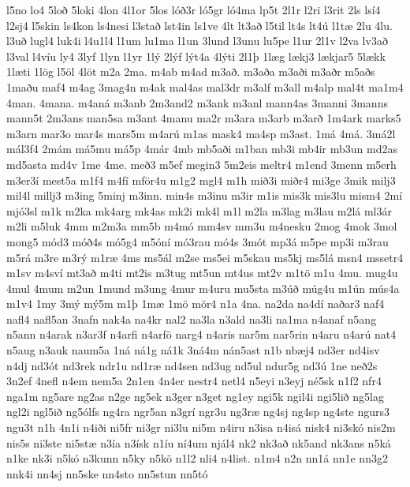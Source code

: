 {l5no
lo4
5lo^^f0
5loki
4lon
4l1or
5los
l^^f3^^f03r
l^^f35gr
l^^f34ma
lp5t
2l1r
l2ri
l3rit
2ls
ls^^ed4
l2sj4
l5skin
ls4kon
ls4nesi
l3sta^^f0
lst4in
ls1ve
4lt
lt3a^^f0
l5til
lt4s
lt4^^fa
l1t^^e6
2lu
4lu.
l3u^^f0
lugl4
luk4i
l4u1l4
l1um
lu1ma
l1un
3lund
l3unu
lu5pe
l1ur
2l1v
l2va
lv3a^^f0
l3val
l4v^^edu
ly4
3lyf
1lyn
l1yr
1l^^fd
2l^^fdf
l^^fdt4a
4l^^fdti
2l1^^fe
1l^^e6g
l^^e6kj3
l^^e6kjar5
5l^^e6kk
1l^^e6ti
1l^^f6g
l5^^f6l
4l^^f6t
m2a
2ma.
m4ab
m4ad
m3a^^f0.
m3a^^f0a
m3a^^f0i
m3a^^f0r
m5a^^f0s
1ma^^f0u
maf4
m4ag
3mag4n
m4ak
mal4as
mal3dr
m3alf
m3all
m4alp
mal4t
ma1m4
4man.
4mana.
m4an^^e1
m3anb
2m3and2
m3ank
m3anl
mann4as
3manni
3manns
mann5t
2m3ans
man5sa
m3ant
4manu
ma2r
m3ara
m3arb
m3ar^^f0
1m4ark
marks5
m3arn
mar3o
mar4s
mars5m
m4ar^^fa
m1as
mask4
ma4sp
m3ast.
1m^^e1
4m^^e1.
3m^^e12l
m^^e1l3f4
2m^^e1m
m^^e15mu
m^^e15p
4m^^e1r
4mb
mb5a^^f0i
m1ban
mb3i
mb4ir
mb3un
md2as
md5asta
md4v
1me
4me.
me^^f03
m5ef
megin3
5m2eis
meltr4
m1end
3menn
m5erh
m3er3^^ed
mest5a
m1f4
m4f^^ed
mf^^f6r4u
m1g2
mgl4
m1h
mi^^f03i
mi^^f0r4
mi3ge
3mik
milj3
mil4l
millj3
m3ing
5minj
m3inn.
min4s
m3inu
m3ir
m1is
mis3k
mis3lu
mism4
2m^^ed
mj^^f33sl
m1k
m2ka
mk4arg
mk4as
mk2i
mk4l
m1l
m2la
m3lag
m3lau
m2l^^e1
ml3^^e1r
m2li
m5luk
4mm
m2m3a
mm5b
m4m^^f3
mm4sv
mm3u
m4nesku
2mog
4mok
3mol
mong5
m^^f3d3
m^^f3^^f04s
m^^f35g4
m5^^f3n^^ed
m^^f33rau
m^^f34s
3m^^f3t
mp3^^e1
m5pe
mp3i
m3rau
m5r^^e1
m3re
m3r^^fd
m1r^^e6
4ms
ms5^^e1l
m2se
ms5ei
m5skau
ms5kj
ms5l^^e1
msn4
mssetr4
m1sv
m4sv^^ed
mt3a^^f0
m4ti
mt2is
m3tug
mt5un
mt4us
mt2v
m1t^^f6
m1u
4mu.
mug4u
4mul
4mum
m2un
1mund
m3ung
4mur
m4uru
mu5sta
m3^^fa^^f0
m^^fag4u
m1^^fan
m^^fas4a
m1v4
1my
3m^^fd
m^^fd5m
m1^^fe
1m^^e6
1m^^f6
m^^f6r4
n1a
4na.
na2da
na4d^^ed
na^^f0ar3
naf4
nafl4
nafl5an
3nafn
nak4a
na4kr
nal2
na3la
n3ald
na3li
na1ma
n4anaf
n5ang
n5ann
n4arak
n3ar3f
n4arfi
n4arf^^f6
narg4
n4aris
nar5m
nar5rin
n4aru
n4ar^^fa
nat4
n5aug
n3auk
naum5a
1n^^e1
n^^e11g
n^^e11k
3n^^e14m
n^^e1n5ast
n1b
nb^^e6j4
nd3er
nd4isv
n4dj
nd3^^f3t
nd3rek
ndr1u
nd1r^^e6
nd4sen
nd3ug
nd5ul
ndur5g
nd3^^fa
1ne
ne^^f02s
3n2ef
4nefl
n4em
nem5a
2n1en
4n4er
nestr4
netl4
n5eyi
n3eyj
n^^e95sk
n1f2
nfr4
nga1m
ng5are
ng2as
n2ge
ng5ek
n3ger
n3get
ng1ey
ngi5k
ngil4i
ngi5li^^f0
ng5lag
ngl2i
ngl5i^^f0
ng5^^f3lfs
ng4ra
ngr5an
n3gr^^ed
ngr3u
ng3r^^e6
ng4sj
ng4sp
ng4ste
ngurs3
ngu3t
n1h
4n1i
n4i^^f0i
ni5fr
ni3gr
ni3lu
ni5m
n4iru
n3isa
n4is^^e1
nisk4
ni3sk^^f3
nis2m
nis5s
ni3ste
ni5st^^e6
n3^^eda
n3^^edsk
n1^^edu
n^^ed4um
nj^^e1l4
nk2
nk3a^^f0
nk5and
nk3ans
n5k^^e1
n1ke
nk3i
n5k^^f3
n3kunn
n5ky
n5k^^f6
n1l2
nli4
n4list.
n1m4
n2n
nn1^^e1
nn1e
nn3g2
nnk4i
nn4sj
nn5ske
nn4sto
nn5stun
nn5t^^f3
}
